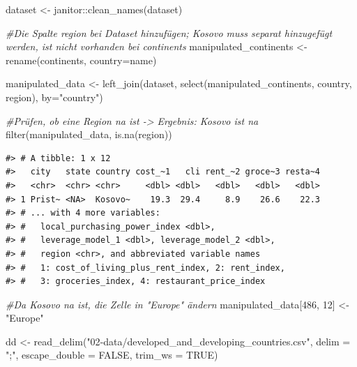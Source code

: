 \documentclass[
  11pt,
  a4paper,
  twoside]{scrbook}
\newenvironment{Shaded}{\begin{snugshade}}{\end{snugshade}}
\newcommand{\AttributeTok}[1]{\textcolor[rgb]{0.77,0.63,0.00}{#1}}
\newcommand{\CommentTok}[1]{\textcolor[rgb]{0.56,0.35,0.01}{\textit{#1}}}
\newcommand{\ConstantTok}[1]{\textcolor[rgb]{0.00,0.00,0.00}{#1}}
\newcommand{\DecValTok}[1]{\textcolor[rgb]{0.00,0.00,0.81}{#1}}
\newcommand{\FunctionTok}[1]{\textcolor[rgb]{0.00,0.00,0.00}{#1}}
\newcommand{\NormalTok}[1]{#1}
\newcommand{\OtherTok}[1]{\textcolor[rgb]{0.56,0.35,0.01}{#1}}
\newcommand{\SpecialCharTok}[1]{\textcolor[rgb]{0.00,0.00,0.00}{#1}}
\newcommand{\StringTok}[1]{\textcolor[rgb]{0.31,0.60,0.02}{#1}}
\begin{document}
\begin{Shaded}
\begin{Highlighting}[]

\NormalTok{dataset }\OtherTok{\textless{}{-}}\NormalTok{ janitor}\SpecialCharTok{::}\FunctionTok{clean\_names}\NormalTok{(dataset)}

\CommentTok{\#Die Spalte region bei Dataset hinzufügen; Kosovo muss separat hinzugefügt werden, ist nicht vorhanden bei continents}
\NormalTok{manipulated\_continents }\OtherTok{\textless{}{-}} \FunctionTok{rename}\NormalTok{(continents, }\AttributeTok{country=}\NormalTok{name)}

\NormalTok{manipulated\_data }\OtherTok{\textless{}{-}} \FunctionTok{left\_join}\NormalTok{(dataset, }\FunctionTok{select}\NormalTok{(manipulated\_continents, country, region), }\AttributeTok{by=}\StringTok{"country"}\NormalTok{)}

\CommentTok{\#Prüfen, ob eine Region na ist {-}\textgreater{} Ergebnis: Kosovo ist na}
\FunctionTok{filter}\NormalTok{(manipulated\_data, }\FunctionTok{is.na}\NormalTok{(region))}
\end{Highlighting}
\end{Shaded}

\linespread{1}

\begin{verbatim}
#> # A tibble: 1 x 12
#>   city   state country cost_~1   cli rent_~2 groce~3 resta~4
#>   <chr>  <chr> <chr>     <dbl> <dbl>   <dbl>   <dbl>   <dbl>
#> 1 Prist~ <NA>  Kosovo~    19.3  29.4     8.9    26.6    22.3
#> # ... with 4 more variables:
#> #   local_purchasing_power_index <dbl>,
#> #   leverage_model_1 <dbl>, leverage_model_2 <dbl>,
#> #   region <chr>, and abbreviated variable names
#> #   1: cost_of_living_plus_rent_index, 2: rent_index,
#> #   3: groceries_index, 4: restaurant_price_index
\end{verbatim}

\linespread{1}

\begin{Shaded}
\begin{Highlighting}[]
\CommentTok{\#Da Kosovo na ist, die Zelle in "Europe" ändern}
\NormalTok{manipulated\_data[}\DecValTok{486}\NormalTok{, }\DecValTok{12}\NormalTok{] }\OtherTok{\textless{}{-}} \StringTok{"Europe"}

\NormalTok{dd }\OtherTok{\textless{}{-}} \FunctionTok{read\_delim}\NormalTok{(}\StringTok{"02{-}data/developed\_and\_developing\_countries.csv"}\NormalTok{,}
                 \AttributeTok{delim =} \StringTok{";"}\NormalTok{, }\AttributeTok{escape\_double =} \ConstantTok{FALSE}\NormalTok{,}
                 \AttributeTok{trim\_ws =} \ConstantTok{TRUE}\NormalTok{)}
\end{Highlighting}
\end{Shaded}
\end{document}
